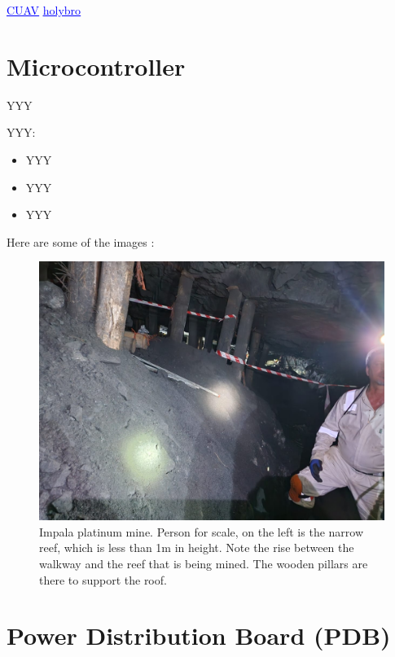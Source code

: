 	\href{https://store.cuav.net/shop/cuav-v6x/}{\textcolor{blue}{\underline{CUAV}}}
	\href{https://holybro.com/products/pixhawk-6x?variant=42471703085245}{\textcolor{blue}{\underline{holybro}}}


\section{Microcontroller}
	YYY
	
	YYY:
	
	\begin{itemize}
		\item YYY
		\item YYY
		\item YYY
	\end{itemize}

	Here are some of the images :

	\begin{figure}[H]
		\centering
		\includegraphics[width=0.7\linewidth]{Images/Impala1}
		\caption{Impala platinum mine. Person for scale, on the left is the narrow reef, which is less than 1m in height. Note the rise between the walkway and the reef that is being mined. The wooden pillars are there to support the roof.}
		\label{fig:Impala1}
	\end{figure}

	
\section{Power Distribution Board (PDB)}
	

